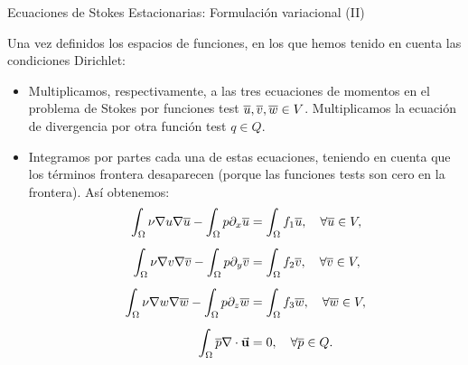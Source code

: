 \documentclass[9pt, dvipsnames,]{beamer}
\newcommand{\Vtest}{\ensuremath{V}}
\begin{document}
\begin{frame}{Ecuaciones de Stokes Estacionarias: Formulación variacional (II)}

  Una vez definidos los espacios de funciones, en los que hemos tenido en cuenta las condiciones Dirichlet:
  \bigskip

\begin{itemize}\itemsep=0.6em
  \item Multiplicamos, respectivamente, a las tres
    ecuaciones de momentos en el problema de Stokes por funciones test
    $\bu, \bv, \bw \in \Vtest$. Multiplicamos la ecuación de divergencia
    por otra función test $q\in Q$.
  \item Integramos por partes cada una de estas ecuaciones, teniendo
    en cuenta que los términos frontera desaparecen (porque las funciones tests son cero en la frontera). Así obtenemos:
    \begin{align*}
      \int_\Omega \nu\grad u\grad\bu - \int_\Omega p\dx \bu &= \int_\Omega f_1 \bu, \quad \forall \bu\in \Vtest,
      \\[0.5em]
      \int_\Omega \nu\grad v\grad\bv - \int_\Omega p\dy \bv &= \int_\Omega f_2 \bv, \quad \forall \bv\in \Vtest,
      \\[0.5em]
      \int_\Omega \nu\grad w\grad\bw - \int_\Omega p\dz \bw &= \int_\Omega f_3 \bw, \quad \forall \bw\in \Vtest,
      \\[0.5em]
      \int_\Omega \bp \div{\uu} & =  0, \quad \forall \bp \in Q.
    \end{align*}

  \end{itemize}
\end{frame}
\end{document}
